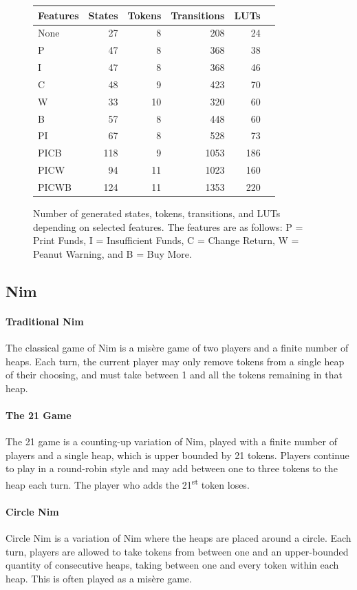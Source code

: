 \documentclass[sigplan,anonymous,review]{acmart}
\begin{document}
\begin{figure}
    \centering
\begin{tabular}{lrrrrr}\toprule
Features &States &Tokens &Transitions &LUTs \\\midrule
None &27 &8 &208 &24 \\
P &47 &8 &368 &38 \\
I &47 &8 &368 &46 \\
C &48 &9 &423 &70 \\
W &33 &10 &320 &60 \\
B &57 &8 &448 &60 \\
PI &67 &8 &528 &73 \\
PICB &118 &9 &1053 &186 \\
PICW &94 &11 &1023 &160 \\
PICWB &124 &11 &1353 &220 \\
\bottomrule
\end{tabular}
    \caption{Number of generated states, tokens, transitions, and LUTs depending on selected features. The features are as follows: P = Print Funds, I = Insufficient Funds, C = Change Return, W = Peanut Warning, and B = Buy More.}
    \label{fig:vmData}
\end{figure}

\subsection{Nim}\label{sec:nim}
\paragraph{Traditional Nim}
The classical game of Nim is a mis\`{e}re game of two players and a finite number of heaps. Each turn, the current player may only remove tokens from a single heap of their choosing, and must take between 1 and all the tokens remaining in that heap. 

\paragraph{The 21 Game}
The 21 game is a counting-up variation of Nim, played with a finite number of players and a single heap, which is upper bounded by 21 tokens. Players continue to play in a round-robin style and may add between one to three tokens to the heap each turn. The player who adds the 21\textsuperscript{st} token loses. 

\paragraph{Circle Nim}
Circle Nim is a variation of Nim where the heaps are placed around a circle. Each turn, players are allowed to take tokens from between one and an upper-bounded quantity of consecutive heaps, taking between one and every token within each heap. This is often played as a mis\`{e}re game. 
\end{document}
